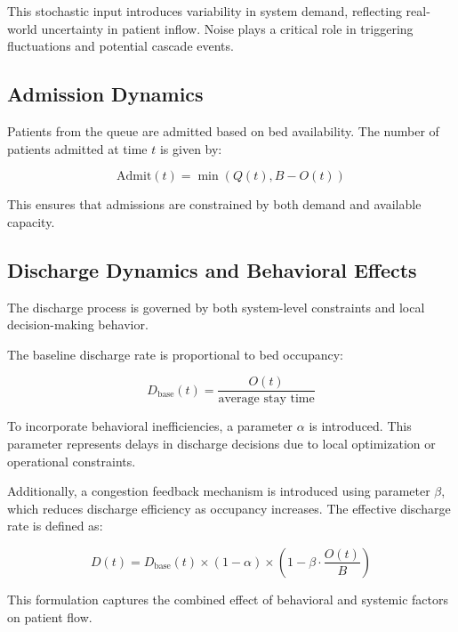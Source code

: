\documentclass[11pt]{article}
\begin{document}
This stochastic input introduces variability in system demand, reflecting real-world uncertainty in patient inflow. Noise plays a critical role in triggering fluctuations and potential cascade events.

\vspace{0.3cm}

\subsection{Admission Dynamics}

Patients from the queue are admitted based on bed availability. The number of patients admitted at time $t$ is given by:

\begin{equation}
\text{Admit}(t) = \min(Q(t), B - O(t))
\end{equation}

This ensures that admissions are constrained by both demand and available capacity.

\vspace{0.3cm}

\subsection{Discharge Dynamics and Behavioral Effects}

The discharge process is governed by both system-level constraints and local decision-making behavior.

The baseline discharge rate is proportional to bed occupancy:

\begin{equation}
D_{\text{base}}(t) = \frac{O(t)}{\text{average stay time}}
\end{equation}

To incorporate behavioral inefficiencies, a parameter $\alpha$ is introduced. This parameter represents delays in discharge decisions due to local optimization or operational constraints.

Additionally, a congestion feedback mechanism is introduced using parameter $\beta$, which reduces discharge efficiency as occupancy increases. The effective discharge rate is defined as:

\begin{equation}
D(t) = D_{\text{base}}(t) \times (1 - \alpha) \times \left(1 - \beta \cdot \frac{O(t)}{B}\right)
\end{equation}

This formulation captures the combined effect of behavioral and systemic factors on patient flow.
\end{document}
